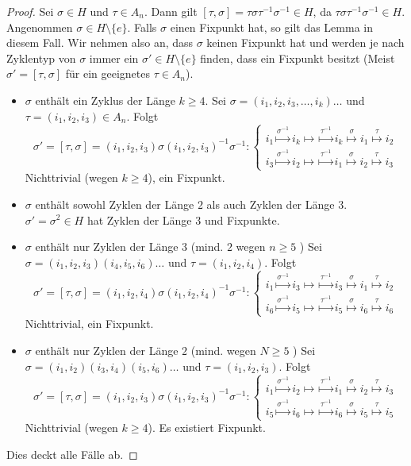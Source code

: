 \begin{proof}
	Sei $\sigma \in H$ und $\tau \in A_{n}$. Dann gilt $[\tau, \sigma] = \tau \sigma \tau^{-1} \sigma^{-1} \in H$, da $\tau \sigma \tau^{-1} \sigma^{-1} \in H$.
	Angenommen $\sigma \in H \setminus \{ e\} $. Falls $\sigma$ einen Fixpunkt hat, so gilt das Lemma in diesem Fall.
	Wir nehmen also an, dass $\sigma$ keinen Fixpunkt hat und werden je nach Zyklentyp von $\sigma$ immer ein $\sigma' \in H \setminus \{e\}$ finden,
	dass ein Fixpunkt besitzt (Meist $\sigma' = [\tau, \sigma]$ für ein geeignetes $\tau \in A_{n}$).
	\begin{itemize}
		\item $\sigma$ enthält ein Zyklus der Länge $k \geq 4$.
			Sei $\sigma = (i_1,i_2,i_3,\ldots,i_{k}) \ldots$ und $\tau = (i_1,i_2,i_3) \in A_{n}$. Folgt 
			\[
				\sigma' = [\tau,\sigma] = (i_1,i_2,i_3) \sigma (i_1,i_2,i_3)^{-1} \sigma^{-1}: \begin{cases}
					i_1 \stackrel{\sigma^{-1}}{\mapsto} i_{k} \mapsto \stackrel{\tau^{-1}}{\mapsto} i_{k} \stackrel{\sigma}{\mapsto} i_1 \stackrel{\tau}{\mapsto} i_2\\
					i_3 \stackrel{\sigma^{-1}}{\mapsto} i_{2} \mapsto \stackrel{\tau^{-1}}{\mapsto} i_{1} \stackrel{\sigma}{\mapsto} i_2 \stackrel{\tau}{\mapsto} i_3
				\end{cases}
			\]
			Nichttrivial (wegen $k\geq 4$), ein Fixpunkt.
		\item $\sigma$ enthält sowohl Zyklen der Länge $2$ als auch Zyklen der Länge $3$.
			$\sigma' = \sigma^2 \in H$ hat Zyklen der Länge $3$ und Fixpunkte.
		\item $\sigma$ enthält nur Zyklen der Länge $3$ (mind. $2$ wegen $n\geq 5$ )
			Sei $\sigma = (i_1,i_2,i_3)(i_4,i_5,i_6) \ldots$ und $\tau = (i_1,i_2,i_4)$. Folgt 
			\[
				\sigma' = [\tau,\sigma] = (i_1,i_2,i_4) \sigma (i_1,i_2,i_4)^{-1} \sigma^{-1}: \begin{cases}
					i_1 \stackrel{\sigma^{-1}}{\mapsto} i_{3} \mapsto \stackrel{\tau^{-1}}{\mapsto} i_{3} \stackrel{\sigma}{\mapsto} i_1 \stackrel{\tau}{\mapsto} i_2\\
					i_6 \stackrel{\sigma^{-1}}{\mapsto} i_{5} \mapsto \stackrel{\tau^{-1}}{\mapsto} i_{5} \stackrel{\sigma}{\mapsto} i_6 \stackrel{\tau}{\mapsto} i_6
				\end{cases}
			\]
			Nichttrivial, ein Fixpunkt.
		\item $\sigma$ enthält nur Zyklen der Länge $2$ (mind. wegen $N \geq 5$ )
			Sei $\sigma = (i_1,i_2)(i_3,i_4)(i_5,i_6) \ldots$ und $\tau = (i_1,i_2,i_3)$. Folgt 
			\[
				\sigma' = [\tau,\sigma] = (i_1,i_2,i_3) \sigma (i_1,i_2,i_3)^{-1} \sigma^{-1}: \begin{cases}
					i_1 \stackrel{\sigma^{-1}}{\mapsto} i_{2} \mapsto \stackrel{\tau^{-1}}{\mapsto} i_{1} \stackrel{\sigma}{\mapsto} i_2 \stackrel{\tau}{\mapsto} i_3\\
					i_5 \stackrel{\sigma^{-1}}{\mapsto} i_{6} \mapsto \stackrel{\tau^{-1}}{\mapsto} i_{6} \stackrel{\sigma}{\mapsto} i_5 \stackrel{\tau}{\mapsto} i_5
				\end{cases}
			\]
			Nichttrivial (wegen $k\geq 4$). Es existiert Fixpunkt.
	\end{itemize}
	Dies deckt alle Fälle ab.
\end{proof}

